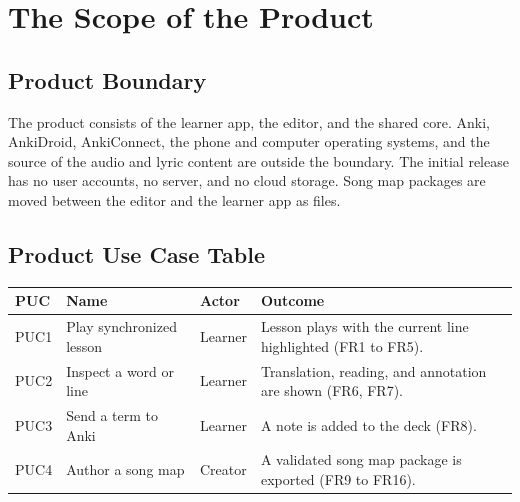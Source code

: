 \documentclass[12pt]{article}
\begin{document}
\section{The Scope of the Product}
\subsection{Product Boundary}
The product consists of the learner app, the editor, and the shared core.
Anki, AnkiDroid, AnkiConnect, the phone and computer operating systems, and
the source of the audio and lyric content are outside the boundary. The
initial release has no user accounts, no server, and no cloud storage. Song map
packages are moved between the editor and the learner app as files.

\subsection{Product Use Case Table}
\begin{tabularx}{\textwidth}{lXlX}
\toprule
\textbf{PUC} & \textbf{Name} & \textbf{Actor} & \textbf{Outcome}\\
\midrule
PUC1 & Play synchronized lesson & Learner & Lesson plays with the current
line highlighted (FR1 to FR5).\\
PUC2 & Inspect a word or line & Learner & Translation, reading, and
annotation are shown (FR6, FR7).\\
PUC3 & Send a term to Anki & Learner & A note is added to the
\progname{} deck (FR8).\\
PUC4 & Author a song map & Creator & A validated song map package is
exported (FR9 to FR16).\\
\bottomrule
\end{tabularx}
\end{document}
